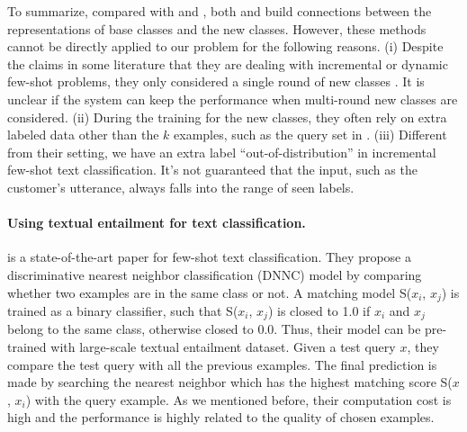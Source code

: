 \documentclass[11pt]{article}
\begin{document}
To summarize, compared with \citet{DBLPSnellSZ17} and \citet{DBLPQiBL18}, both \citet{DBLPGidarisK18} and \citet{DBLPRenLFZ19} build connections between the representations of base classes and the new classes.
However, these methods cannot be directly applied to our problem for the following reasons. (i) Despite the claims in some literature that they are dealing with incremental or dynamic few-shot problems, they only considered a single round of new classes \cite{DBLPQiBL18,DBLPGidarisK18,DBLPRenLFZ19}. It is unclear if the system can keep the performance when multi-round new classes are considered.
(ii) During the training for the new classes, they often rely on extra labeled data other than the $k$ examples, such as the query set in \citet{DBLPRenLFZ19}.
(iii) Different from their setting, we have an extra label ``out-of-distribution'' in incremental few-shot text classification. It's not guaranteed that the input, such as the customer's utterance, always falls into the range of seen labels.

\paragraph{Using textual entailment for text classification.}
\citet{zhangdiscriminative} is a state-of-the-art paper for few-shot text classification. 
They propose a discriminative nearest neighbor classification (DNNC) model by comparing whether two examples are in the same class or not.
A matching model S($x_i$, $x_j$) is trained as a binary classifier, such that S($x_i$, $x_j$) is closed to 1.0 if $x_i$ and $x_j$ belong to the same class, otherwise closed to 0.0. Thus, their model can be pre-trained with large-scale textual entailment dataset. Given a test query $x$, they compare the test query with all the previous examples. The final prediction is made by searching the nearest neighbor which has the highest matching score S($x$, $x_i$) with the query example. As we mentioned before, their computation cost is high and the performance is highly related to the quality of chosen examples.
\end{document}
